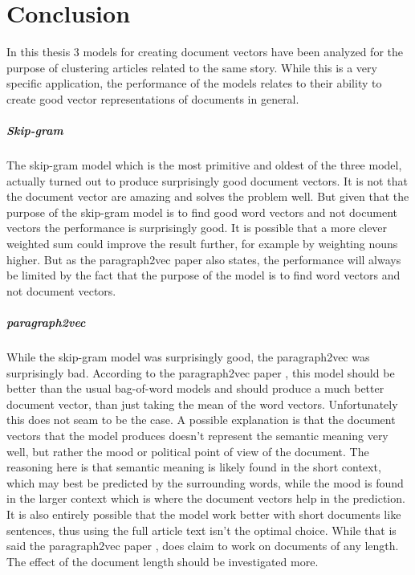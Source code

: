 \chapter{Conclusion}

In this thesis 3 models for creating document vectors have been analyzed for the purpose of clustering articles related to the same story. While this is a very specific application, the performance of the models relates to their ability to create good vector representations of documents in general.

\paragraph{Skip-gram} The skip-gram model which is the most primitive and oldest of the three model, actually turned out to produce surprisingly good document vectors. It is not that the document vector are amazing and solves the problem well. But given that the purpose of the skip-gram model is to find good word vectors and not document vectors the performance is surprisingly good. It is possible that a more clever weighted sum could improve the result further, for example by weighting nouns higher. But as the paragraph2vec paper \cite{doc2vec} also states, the performance will always be limited by the fact that the purpose of the model is to find word vectors and not document vectors.

\paragraph{paragraph2vec} While the skip-gram model was surprisingly good, the paragraph2\-vec was surprisingly bad. According to the paragraph2vec paper \cite{doc2vec}, this model should be better than the usual bag-of-word models and should produce a much better document vector, than just taking the mean of the word vectors. Unfortunately this does not seam to be the case. A possible explanation is that the document vectors that the model produces doesn't represent the semantic meaning very well, but rather the mood or political point of view of the document. The reasoning here is that semantic meaning is likely found in the short context, which may best be predicted by the surrounding words, while the mood is found in the larger context which is where the document vectors help in the prediction. It is also entirely possible that the model work better with short documents like sentences, thus using the full article text isn't the optimal choice. While that is said the paragraph2vec paper \cite{doc2vec}, does claim to work on documents of any length. The effect of the document length should be investigated more.

